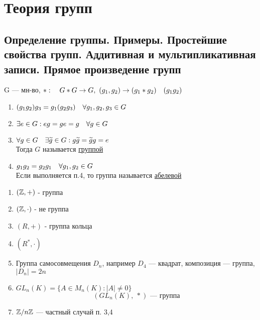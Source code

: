 \documentclass[main]{subfiles}
\begin{document}
    \section{Теория групп}
    \subsection{Определение группы. Примеры. Простейшие свойства групп. Аддитивная и мультипликативная записи. Прямое произведение групп}

    \begin{definition}
        G --- мн-во, $*: \quad G*G \rightarrow G,\ (g_1, g_2) \rightarrow (g_1*g_2)\quad (g_1g_2)$
        \begin{enumerate}
        	\item $(g_1g_2)g_3 = g_1(g_2g_3) \quad \forall g_1, g_2, g_3 \in G$
        	\item $\exists e \in G : eg = ge = g \quad \forall g \in G$
        	\item $\forall g \in G \quad \exists \widetilde{g} \in G : g\widetilde{g} = \widetilde{g}g = e$\\
            Тогда $G$ называется \ul{группой}\\
        	\item $g_1g_2 = g_2g_1 \quad \forall g_1, g_2 \in G$\\
            Если выполняется п.4, то группа называется \ul{абелевой}
    	\end{enumerate}
    \end{definition}

    \begin{examples}
        \begin{enumerate}
            \item $(\mathbb{Z},+)$ - группа
            \item $(\mathbb{Z}, \cdot)$ - не группа
            \item $(R, +)$ - группа кольца
            \item $(R^*, \cdot)$
            \item Группа самосовмещения $D_n$, например $D_4$ --- квадрат, композиция --- группа, $|D_n|=2n$
            \item $GL_n(K) = \{A \in M_n(K) : |A| \neq 0\}$
            \[(GL_n(K),\ *) \text{ --- группа}\]
            \item $\mathbb{Z}/ n\mathbb{Z}$ --- частный случай п. 3,4
        \end{enumerate}
    \end{examples}
\end{document}
